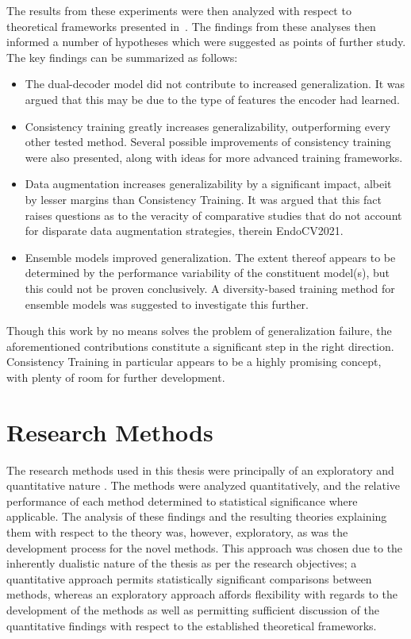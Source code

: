     The results from these experiments were then analyzed with respect to theoretical frameworks presented in~. The findings from these analyses then informed a number of hypotheses which were suggested as points of further study. The key findings can be summarized as follows:
    \begin{itemize}
        \item The dual-decoder model did not contribute to increased generalization. It was argued that this may be due to the type of features the encoder had learned.
    
        \item Consistency training greatly increases generalizability, outperforming every other tested method. Several possible improvements of consistency training were also presented, along with ideas for more advanced training frameworks.
        
        \item Data augmentation increases generalizability by a significant impact, albeit by lesser margins than Consistency Training. It was argued that this fact raises questions as to the veracity of comparative studies that do not account for disparate data augmentation strategies, therein EndoCV2021.
    

        \item Ensemble models improved generalization. The extent thereof appears to be determined by the performance variability of the constituent model(s), but this could not be proven conclusively. A diversity-based training method for ensemble models was suggested to investigate this further.
    \end{itemize}

    Though this work by no means solves the problem of generalization failure, the aforementioned contributions constitute a significant step in the right direction. Consistency Training in particular appears to be a highly promising concept, with plenty of room for further development. 
    
    \section{Research Methods}
    The research methods used in this thesis were principally of an exploratory and quantitative nature \cite{research_methods}. The methods were analyzed quantitatively, and the relative performance of each method determined to statistical significance where applicable. The analysis of these findings and the resulting theories explaining them with respect to the theory was, however, exploratory, as was the development process for the novel methods. This approach was chosen due to the inherently dualistic nature of the thesis as per the research objectives; a quantitative approach permits statistically significant comparisons between methods, whereas an exploratory approach affords flexibility with regards to the development of the methods as well as permitting sufficient discussion of the quantitative findings with respect to the established theoretical frameworks. 
    
